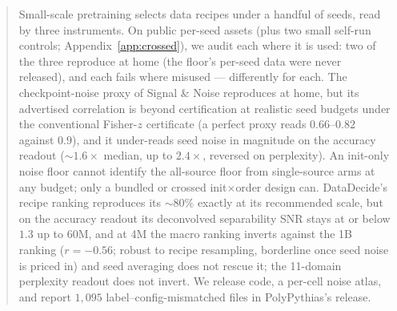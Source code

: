 
\begin{abstract}
Small-scale pretraining selects data recipes under a handful of seeds, read by three
instruments. On public per-seed assets (plus two small self-run controls;
Appendix~\ref{app:crossed}), we audit each where it is used: two of the three reproduce at home (the floor's per-seed data were never released), and each fails where misused --- differently for each. The checkpoint-noise proxy of Signal
\& Noise reproduces at home, but its advertised correlation is beyond certification at
realistic seed budgets under the conventional Fisher-$z$ certificate (a perfect proxy reads
$0.66$--$0.82$ against $0.9$), and it under-reads seed noise in magnitude on the accuracy
readout (${\sim}1.6\times$ median, up to $2.4\times$, reversed on perplexity). An init-only
noise floor cannot identify the all-source floor from single-source arms at any budget; only
a bundled or crossed init$\times$order design can. DataDecide's recipe ranking reproduces
its ${\sim}80\%$ exactly at its recommended scale, but on the accuracy readout its
deconvolved separability SNR stays at or below $1.3$ up to 60M, and at 4M the macro ranking inverts
against the 1B ranking ($r = -0.56$; robust to recipe resampling, borderline once seed noise
is priced in) and seed averaging does not rescue it; the 11-domain perplexity readout does
not invert. We release code, a per-cell noise atlas, and report $1{,}095$ label--config-mismatched files in PolyPythias's
release.
\end{abstract}
